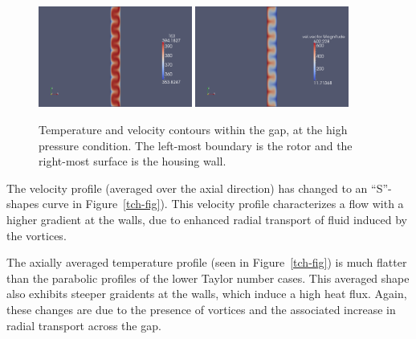 \begin{figure}[htbp]
\begin{center}
\includegraphics[width=0.45\textwidth]{../3D/taylor-couette/temperature.png}
\includegraphics[width=0.45\textwidth]{../3D/taylor-couette/velocity.png}
\end{center}
\caption{Temperature and velocity contours within the gap, at the high pressure condition.
         The left-most boundary is the rotor and the right-most surface is the housing wall.}
\label{tv-fig}
\end{figure}

\medskip
The velocity profile (averaged over the axial direction) has changed to an ``S''-shapes curve 
in Figure~\ref{tch-fig}). 
This velocity profile characterizes a flow with a higher gradient at the walls,
due to enhanced radial transport of fluid induced by the vortices.

\medskip
The axially averaged temperature profile (seen in Figure~\ref{tch-fig}) 
is much flatter than the parabolic profiles of the lower Taylor number cases.
This averaged shape also exhibits steeper graidents at the walls, 
which induce a high heat flux. 
Again, these changes are due to the presence of vortices and the associated increase in radial transport
across the gap.

